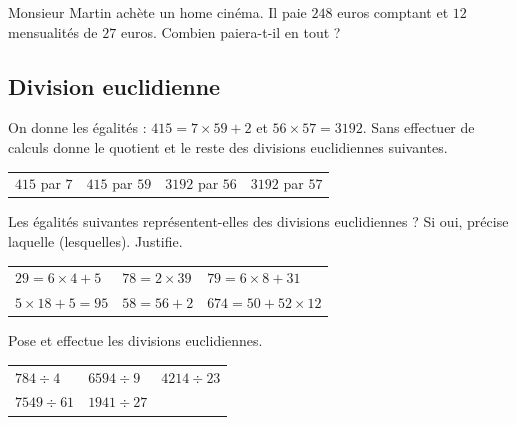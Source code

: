\documentclass[a4paper,10pt]{report}
\begin{document}
\begin{ex}
Monsieur Martin achète un home cinéma. Il paie $248$ euros comptant et $12$ mensualités de $27$ euros. Combien paiera-t-il en tout ?
\end{ex}

\subsection*{Division euclidienne}

\begin{ex}
On donne les égalités : $415=7×59+2$ et $56×57=3192$. Sans effectuer de calculs donne le quotient et le reste des divisions euclidiennes suivantes.
\begin{enumerate}
\begin{tabular}{m{4cm}m{4cm}m{4cm}m{4cm}}
\item $415$ par $7$&
\item $415$ par $59$&
\item $3192$ par $56$&
\item $3192$ par $57$\\
\end{tabular}
\end{enumerate} 
\end{ex}

\begin{ex}
Les égalités suivantes représentent-elles des divisions euclidiennes ? Si oui, précise laquelle (lesquelles). Justifie.
\begin{enumerate}
\begin{tabular}{m{5cm}m{5cm}m{5cm}}
\item $29=6\times 4+5$&
\item $78=2\times 39$&
\item $79=6\times 8+31$\\
\item $5\times 18+5=95$&
\item $58=56+2$&
\item $674=50+52\times 12$\\
\end{tabular}
\end{enumerate} 
\end{ex}

\begin{ex}
Pose et effectue les divisions euclidiennes.
\begin{enumerate}
\begin{tabular}{m{5cm}m{5cm}m{5cm}}
\item $784\div 4$&
\item $6594\div 9$& 
\item $4214\div 23$\\
\item $7549\div 61$&
\item $1941\div 27$&\\
\end{tabular}
\end{enumerate} 
\end{ex}
\end{document}

